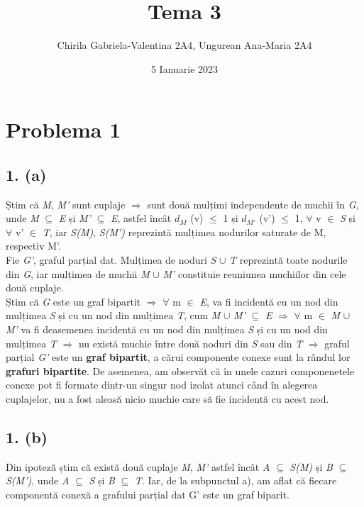 \documentclass[12pt] {fphw}
\title{Tema 3}
\author{Chirila Gabriela-Valentina 2A4, Ungurean Ana-Maria 2A4 } %
\date{5 Ianuarie 2023} %
\institute{Universitatea Alexandru Ioan-Cuza \\ Facultatea de Informatică} %
\begin{document}
\maketitle 

\section*{Problema 1}
\subsection*{1. (a)} 
      Știm că \textit{M}, \textit{M'} sunt cuplaje $\Rightarrow$ sunt două mulțimi independente de muchii în \textit{G}, unde  \textit{M} $\subseteq$  \textit{E} și \textit{M'} $\subseteq$  \textit{E}, astfel încât $d_{M}$ (v) $\leq$ 1 și $d_{M'}$ (v') $\leq$ 1, $\forall$ v $\in$  \textit{S} și $\forall$ v' $\in$  \textit{T}, iar  \textit{S(M)}, \textit{S(M')} reprezintă mulțimea nodurilor saturate de M, respectiv M'. \\ 

Fie \textit{G'}, graful parțial dat. Mulțimea de noduri \textit{S} $\cup$ \textit{T} reprezintă toate nodurile din \textit{G}, iar mulțimea de muchii \textit{M} $\cup$ \textit{M'} constituie reuniunea muchiilor din cele două cuplaje. \\
Știm că \textit{G} este un graf bipartit $\Rightarrow$ $\forall$ m $\in$  \textit{E}, va fi incidentă cu un nod din mulțimea \textit{S} și cu un nod din mulțimea \textit{T}, cum \textit{M} $\cup$ \textit{M'} $\subseteq$  \textit{E} $\Rightarrow$ $\forall$ m $\in$ \textit{M} $\cup$ \textit{M'} va fi deasemenea incidentă cu un nod din mulțimea \textit{S} și cu un nod din mulțimea \textit{T}  $\Rightarrow$ nu există muchie între două noduri din \textit{S} sau din \textit{T} $\Rightarrow$ graful parțial \textit{G'} este un \textbf{graf bipartit}, a cărui componente conexe sunt la rândul lor \textbf{grafuri bipartite}. De asemenea, am observăt că în unele cazuri componenetele conexe pot fi formate dintr-un singur nod izolat atunci când în alegerea cuplajelor, nu a fost aleasă nicio muchie care să fie incidentă cu acest nod. 

\subsection*{1. (b)} 
   Din ipoteză știm că există două cuplaje \textit{M}, \textit{M'} astfel încât \textit{A} $\subseteq$ \textit{S(M)} și  \textit{B} $\subseteq$  \textit{S(M')}, unde \textit{A} $\subseteq$ \textit{S} și  \textit{B} $\subseteq$  \textit{T}. Iar, de la subpunctul a), am aflat că fiecare componentă conexă a grafului parțial dat G' este un graf biparit. \\
\end{document}
